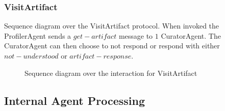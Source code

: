 \documentclass[paper=letter, fontsize=12pt]{article}
\begin{document}
\subsubsection{VisitArtifact}
Sequence diagram over the VisitArtifact protocol. When invoked the ProfilerAgent sends a $get-artifact$ message to $1$ CuratorAgent. The CuratorAgent can then choose to not respond or respond with either $not-understood$ or $artifact-response$.
\begin{figure}[H]
  \begin{center}
    \caption{Sequence diagram over the interaction for VisitArtifact}
    \label{fig:visit_artifact_sequence}
  \end{center}
\end{figure}
\subsection{Internal Agent Processing}
\end{document}
